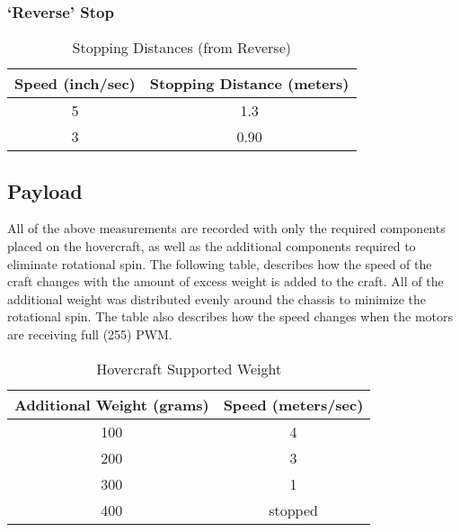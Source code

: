 \subsubsection{`Reverse' Stop}
\begin{table}
\caption{Stopping Distances (from Reverse)}
\begin{center}
\begin{tabular}{ c c }
  Speed (inch/sec) & Stopping Distance (meters) \\
  \hline
  5 & 1.3 \\
  3 & 0.90 \\
\end{tabular}
\end{center}
\label{reverseTable}
\end{table}

\subsection{Payload}
All of the above measurements are recorded with only the required components placed on the hovercraft, as well as the additional components required to eliminate rotational spin. The following table, describes how the speed of the craft changes with the amount of excess weight is added to the craft. All of the additional weight was distributed evenly around the chassis to minimize the rotational spin. The table also describes how the speed changes when the motors are receiving full (255) PWM.
\begin{table}
\caption{Hovercraft Supported Weight}
\begin{center}
\begin{tabular}{ c c }
  Additional Weight (grams) & Speed (meters/sec) \\
  \hline
  100 & 4 \\
  200 & 3 \\
  300 & 1 \\
  400 & stopped \\
\end{tabular}
\end{center}
\label{weightTable}
\end{table}
